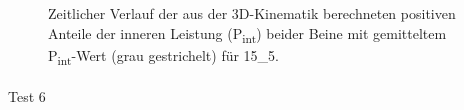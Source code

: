 \documentclass[
  letterpaper,
  DIV=11]{scrartcl}
\makeatletter
\let\oldparagraph\paragraph
\renewcommand{\paragraph}{
    \@ifstar
      \xxxParagraphStar
      \xxxParagraphNoStar
  }
\newcommand{\xxxParagraphStar}[1]{\oldparagraph*{#1}\mbox{}}
\newcommand{\xxxParagraphNoStar}[1]{\oldparagraph{#1}\mbox{}}
\makeatother
\begin{document}
\begin{figure}


\caption{\label{fig-PInt_Kinematik_15_5}Zeitlicher Verlauf der aus der
3D-Kinematik berechneten positiven Anteile der inneren Leistung
(P\textsubscript{int}) beider Beine mit gemitteltem
P\textsubscript{int}-Wert (grau gestrichelt) für 15\_5.}

\end{figure}%

\paragraph{Test 6}
\end{document}

